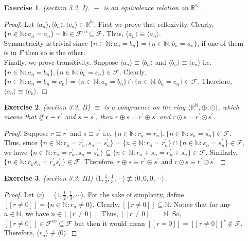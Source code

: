 \documentclass[a4paper, 11pt]{book}
\theoremstyle{plain}
\newtheorem{exercise}{Exercise}[chapter]
\theoremstyle{plain}
\newcommand{\mc}{\mathcal}
\newcommand{\co}{\text{co}}
\newcommand{\N}{\mathbb{N}}
\newcommand{\R}{\mathbb{R}}
\newcommand{\la}{\langle}
\newcommand{\ra}{\rangle}
\newcommand{\op}{\oplus}
\newcommand{\od}{\odot}
\newcommand{\p}{\prime}
\begin{document}
  \begin{exercise}
    (section 3.3, I). $\equiv$ is an equivalence relation on $\R^\N$.
  \end{exercise}
  \begin{proof} Let $\langle a_n \rangle, \langle b_n \rangle, \langle c_n \rangle \in \R^\N$.
    First we prove that reflexivity. Clearly, $\{n \in \N: a_n=a_n\}=\N \in \mc{F}^\co \subseteq \mc{F}$. Thus, $\langle a_n \rangle \equiv \langle a_n \rangle$. \\
    Symmetricity is trivial since $\{n \in \N: a_n=b_n\}=\{n \in \N: b_n=a_n\}$, if one of them is in $F$ then so is the other. \\
    Finally, we prove transitivity. Suppose $\la a_n \ra \equiv \la b_n \ra$ and $\la b_n \ra \equiv \la c_n \ra$ i.e. $\{n \in \N: a_n=b_n\}, \{n \in \N: b_n=c_n\} \in \mc{F}$. Clearly, $\{n \in \N: a_n=b_n=c_n\}=\{n \in \N: a_n=b_n\} \cap \{n \in \N: b_n=c_n\} \in \mc{F}$. Therefore, $\la a_n \ra \equiv \la c_n \ra$.
  \end{proof}
  \begin{exercise} (section 3.3, II)
    $\equiv$ is a congruence on the ring $\la \R^\N, \op, \od \ra$, which means that if $r \equiv r^\p$ and $s \equiv s^\p$, then $r \op s=r^\p \op s^\p$ and $r \od s=r^\p \od s^\p$.
  \end{exercise}
  \begin{proof}
    Suppose $r \equiv r^{\p}$ and $s \equiv s^{\p}$ i.e. $ \{n \in \N: r_n=r^\p_n \}, \{n \in \N: s_n=s_n^\p \} \in \mc{F}$. Thus, since $ \{n \in \N: r_n=r_n^\p, s_n=s_n^\p \}=\{n \in \N: r_n=r_n^\p \} \cap \{n \in \N: s_n=s_n^\p \} \in \mc{F}$, we have $\{n \in \N: r_n=r_n^\p, s_n=s_n^\p \} \subseteq \{n \in \N: r_n+s_n=r_n^\p+s_n^\p \} \in \mc{F}$. Similarly, $\{n \in \N: r_ns_n=r_n^\p s_n^\p \} \in \mc{F}$. Therefore, $r\op s \equiv r^\p \op s^\p$ and $r \od s \equiv r^\p \od s^\p$.
  \end{proof}
  \begin{exercise} (section 3.3, III)
    $\la 1, \frac{1}{2}, \frac{1}{3}, \cdots \ra \not \equiv \la 0, 0, 0, \cdots \ra$. 
  \end{exercise}
  \begin{proof}
    Let $\la r \ra=\la 1, \frac{1}{2}, \frac{1}{3}, \cdots \ra$. For the sake of simplicity, define $[[r \not =0]]=\{n \in \N:r_n \not =0\}$. Clearly, $[[r \not =0]] \subseteq \N$. Notice that for any $n \in \N$, we have $n \in [[r \not =0]]$. Thus, $[[r \not =0]]=\N$. So, $[[r \not =0]] \in \mc{F}^\co \subseteq \mc{F}$ but then it would mean $[[r=0]]=[[r \not=0]]^c \notin \mc{F}$. Therefore, $\la r_n \ra \not \equiv \la 0 \ra$.
  \end{proof}
\end{document}
